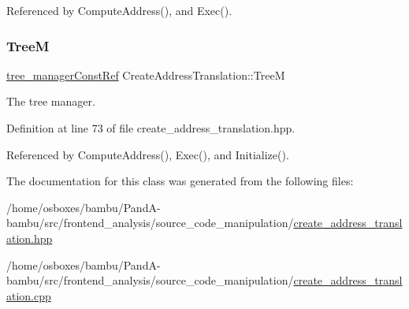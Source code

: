 Referenced by Compute\+Address(), and Exec().

\mbox{\label{classCreateAddressTranslation_a576636dd93b1399610782fbcb3d4b03c}} 
\subsubsection{\texorpdfstring{TreeM}{TreeM}}
{\footnotesize\ttfamily \hyperlink{tree__manager_8hpp_a792e3f1f892d7d997a8d8a4a12e39346}{tree\+\_\+manager\+Const\+Ref} Create\+Address\+Translation\+::\+TreeM\hspace{0.3cm}{\ttfamily [protected]}}



The tree manager. 



Definition at line 73 of file create\+\_\+address\+\_\+translation.\+hpp.



Referenced by Compute\+Address(), Exec(), and Initialize().



The documentation for this class was generated from the following files\+:\begin{DoxyCompactItemize}
\item 
/home/osboxes/bambu/\+Pand\+A-\/bambu/src/frontend\+\_\+analysis/source\+\_\+code\+\_\+manipulation/\hyperlink{create__address__translation_8hpp}{create\+\_\+address\+\_\+translation.\+hpp}\item 
/home/osboxes/bambu/\+Pand\+A-\/bambu/src/frontend\+\_\+analysis/source\+\_\+code\+\_\+manipulation/\hyperlink{create__address__translation_8cpp}{create\+\_\+address\+\_\+translation.\+cpp}\end{DoxyCompactItemize}
